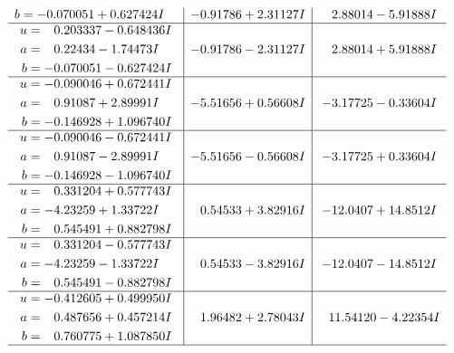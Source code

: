 \documentclass[1p]{elsarticle_modified}
\theoremstyle{definition}
\begin{document}
$$\begin{array}{c|c|c}
\begin{aligned}
b &= -0.070051 + 0.627424 I\end{aligned}
 & -0.91786 + 2.31127 I & \phantom{-}2.88014 - 5.91888 I \\ \hline\begin{aligned}
u &= \phantom{-}0.203337 - 0.648436 I \\
a &= \phantom{-}0.22434 - 1.74473 I \\
b &= -0.070051 - 0.627424 I\end{aligned}
 & -0.91786 - 2.31127 I & \phantom{-}2.88014 + 5.91888 I \\ \hline\begin{aligned}
u &= -0.090046 + 0.672441 I \\
a &= \phantom{-}0.91087 + 2.89991 I \\
b &= -0.146928 + 1.096740 I\end{aligned}
 & -5.51656 + 0.56608 I & -3.17725 - 0.33604 I \\ \hline\begin{aligned}
u &= -0.090046 - 0.672441 I \\
a &= \phantom{-}0.91087 - 2.89991 I \\
b &= -0.146928 - 1.096740 I\end{aligned}
 & -5.51656 - 0.56608 I & -3.17725 + 0.33604 I \\ \hline\begin{aligned}
u &= \phantom{-}0.331204 + 0.577743 I \\
a &= -4.23259 + 1.33722 I \\
b &= \phantom{-}0.545491 + 0.882798 I\end{aligned}
 & \phantom{-}0.54533 + 3.82916 I & -12.0407 + 14.8512 I \\ \hline\begin{aligned}
u &= \phantom{-}0.331204 - 0.577743 I \\
a &= -4.23259 - 1.33722 I \\
b &= \phantom{-}0.545491 - 0.882798 I\end{aligned}
 & \phantom{-}0.54533 - 3.82916 I & -12.0407 - 14.8512 I \\ \hline\begin{aligned}
u &= -0.412605 + 0.499950 I \\
a &= \phantom{-}0.487656 + 0.457214 I \\
b &= \phantom{-}0.760775 + 1.087850 I\end{aligned}
 & \phantom{-}1.96482 + 2.78043 I & \phantom{-}11.54120 - 4.22354 I\\
 \hline 
 \end{array}$$\newpage$$\begin{array}{c|c|c}  

\end{array}$$
\end{document}
